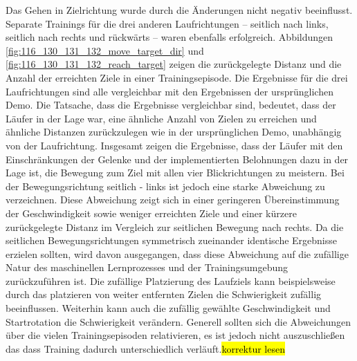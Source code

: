 Das Gehen in Zielrichtung wurde durch die Änderungen nicht negativ beeinflusst. Separate Trainings für die drei anderen Laufrichtungen – seitlich nach links, seitlich nach rechts und rückwärts – waren ebenfalls erfolgreich. Abbildungen \ref{fig:116_130_131_132_move_target_dir} und \ref{fig:116_130_131_132_reach_target} zeigen die zurückgelegte Distanz und die Anzahl der erreichten Ziele in einer Trainingsepisode. Die Ergebnisse für die drei Laufrichtungen sind alle vergleichbar mit den Ergebnissen der ursprünglichen Demo. Die Tatsache, dass die Ergebnisse  \grqq{}vergleichbar \grqq{} sind, bedeutet, dass der Läufer in der Lage war, eine ähnliche Anzahl von Zielen zu erreichen und ähnliche Distanzen zurückzulegen wie in der ursprünglichen Demo, unabhängig von der Laufrichtung. Insgesamt zeigen die Ergebnisse, dass der Läufer mit den Einschränkungen der Gelenke und der implementierten Belohnungen dazu in der Lage ist, die Bewegung zum Ziel mit allen vier Blickrichtungen zu meistern. Bei der Bewegungsrichtung seitlich - links ist jedoch eine starke Abweichung zu verzeichnen. Diese Abweichung zeigt sich in einer geringeren Übereinstimmung der Geschwindigkeit sowie weniger erreichten Ziele und einer kürzere zurückgelegte Distanz im Vergleich zur seitlichen Bewegung nach rechts. Da die seitlichen Bewegungsrichtungen symmetrisch zueinander identische Ergebnisse erzielen sollten, wird davon ausgegangen, dass diese Abweichung auf die zufällige Natur des maschinellen Lernprozesses und der Trainingsumgebung zurückzuführen ist. Die zufällige Platzierung des Laufziels kann beispielsweise durch das platzieren von weiter entfernten Zielen die Schwierigkeit zufällig beeinflussen. Weiterhin kann auch die zufällig gewählte Geschwindigkeit und Startrotation die Schwierigkeit verändern. Generell sollten sich die Abweichungen über die vielen Trainingsepisoden relativieren, es ist jedoch nicht auszuschließen das dass Training dadurch unterschiedlich verläuft.\hl{korrektur lesen}

